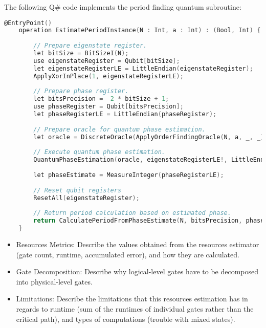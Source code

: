 
The following Q\# code implements the period finding quantum subroutine:

\begin{lstlisting}[language=C]
    @EntryPoint()
    operation EstimatePeriodInstance(N : Int, a : Int) : (Bool, Int) {
    
        // Prepare eigenstate register.
        let bitSize = BitSizeI(N);
        use eigenstateRegister = Qubit[bitSize];
        let eigenstateRegisterLE = LittleEndian(eigenstateRegister);
        ApplyXorInPlace(1, eigenstateRegisterLE);
    
        // Prepare phase register.
        let bitsPrecision =  2 * bitSize + 1;
        use phaseRegister = Qubit[bitsPrecision];
        let phaseRegisterLE = LittleEndian(phaseRegister);
    
        // Prepare oracle for quantum phase estimation.
        let oracle = DiscreteOracle(ApplyOrderFindingOracle(N, a, _, _));
    
        // Execute quantum phase estimation.
        QuantumPhaseEstimation(oracle, eigenstateRegisterLE!, LittleEndianAsBigEndian(phaseRegisterLE));
    
        let phaseEstimate = MeasureInteger(phaseRegisterLE);
    
        // Reset qubit registers 
        ResetAll(eigenstateRegister);
    
        // Return period calculation based on estimated phase.
        return CalculatePeriodFromPhaseEstimate(N, bitsPrecision, phaseEstimate);
    }
\end{lstlisting}


\begin{itemize}
    \item Resources Metrics: Describe the values obtained from the resources estimator (gate count, runtime, accumulated error), and how they are calculated.
    \item Gate Decomposition: Describe why logical-level gates have to be decomposed into physical-level gates.
    \item Limitations: Describe the limitations that this resources estimation has in regards to runtime (sum of the runtimes of individual gates rather than the critical path), and types of computations (trouble with mixed states).
\end{itemize}
